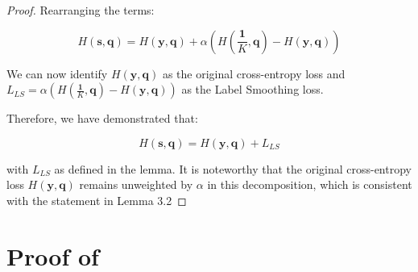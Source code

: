 \begin{proof}
Rearranging the terms:

\begin{equation}
H(\mathbf{s}, \mathbf{q}) = H(\mathbf{y}, \mathbf{q}) + \alpha\left(H\left(\frac{\mathbf{1}}{K}, \mathbf{q}\right) - H(\mathbf{y}, \mathbf{q})\right)
\end{equation}

We can now identify $H(\mathbf{y}, \mathbf{q})$ as the original cross-entropy loss and $L_{LS} = \alpha\left(H\left(\frac{\mathbf{1}}{K}, \mathbf{q}\right) - H(\mathbf{y}, \mathbf{q})\right)$ as the Label Smoothing loss.

Therefore, we have demonstrated that:

\begin{equation}
H(\mathbf{s}, \mathbf{q}) = H(\mathbf{y}, \mathbf{q}) + L_{LS}
\end{equation}

with $L_{LS}$ as defined in the lemma. It is noteworthy that the original cross-entropy loss $H(\mathbf{y}, \mathbf{q})$ remains unweighted by $\alpha$ in this decomposition, which is consistent with the statement in Lemma 3.2
\end{proof}

\section{Proof of }
\label{proof:the}

